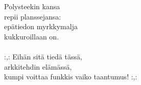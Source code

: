 
            Polysteekin kansa \\
            repii planssejansa: \\
            epätiedon myrkkymalja \\
            kukkuroillaan on. \\
\hspace{10mm} \\
            :,: Eihän sitä tiedä tässä, \\
            arkkitehdin elämässä, \\
            kumpi voittaa funkkis vaiko taantumus! :,: \\
